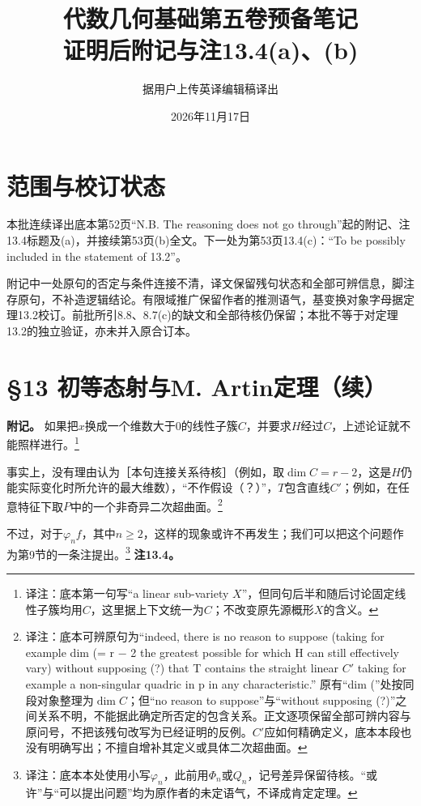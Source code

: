 \documentclass[openany,fontset=fandol]{ctexbook}
\newcommand{\note}[1]{\footnote{译注：#1}}
\begin{document}
\title{代数几何基础第五卷预备笔记\\证明后附记与注13.4(a)、(b)}
\author{据用户上传英译编辑稿译出}
\date{2026年11月17日}
\maketitle
\chapter*{范围与校订状态}
本批连续译出底本第52页“N.B. The reasoning does not go through”起的附记、注13.4标题及(a)，并接续第53页(b)全文。下一处为第53页13.4(c)：“To be possibly included in the statement of 13.2”。

附记中一处原句的否定与条件连接不清，译文保留残句状态和全部可辨信息，脚注存原句，不补造逻辑结论。有限域推广保留作者的推测语气，基变换对象字母据定理13.2校订。前批所引8.8、8.7(c)的缺文和全部待核仍保留；本批不等于对定理13.2的独立验证，亦未并入原合订本。
\chapter*{§13 初等态射与M. Artin定理（续）}
\noindent\textbf{附记。}
如果把$x$换成一个维数大于0的线性子簇$C$，并要求$H$经过$C$，上述论证就不能照样进行。\note{底本第一句写“a linear sub-variety $X$”，但同句后半和随后讨论固定线性子簇均用$C$，这里据上下文统一为$C$；不改变原先源概形$X$的含义。}

事实上，没有理由认为［本句连接关系待核］（例如，取$\dim C=r-2$，这是$H$仍能实际变化时所允许的最大维数），“不作假设（？）”，$T$包含直线$C'$；例如，在任意特征下取$P$中的一个非奇异二次超曲面。\note{底本可辨原句为“indeed, there is no reason to suppose (taking for example dim (= r − 2 the greatest possible for which H can still effectively vary) without supposing (?) that T contains the straight linear $C'$ taking for example a non-singular quadric in p in any characteristic.” 原有“dim (”处按同段对象整理为$\dim C$；但“no reason to suppose”与“without supposing (?)”之间关系不明，不能据此确定所否定的包含关系。正文逐项保留全部可辨内容与原问号，不把该残句改写为已经证明的反例。$C'$应如何精确定义，底本本段也没有明确写出；不擅自增补其定义或具体二次超曲面。}

不过，对于$\varphi_n f$，其中$n\geq2$，这样的现象或许不再发生；我们可以把这个问题作为第9节的一条注提出。\note{底本本处使用小写$\varphi_n$，此前用$\Phi_n$或$Q_n$，记号差异保留待核。“或许”与“可以提出问题”均为原作者的未定语气，不译成肯定定理。}
\newpage
\noindent\textbf{注13.4。}
\end{document}
